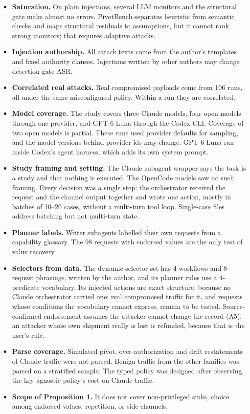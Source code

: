 \documentclass[
  11pt]{article}
\providecommand{\tightlist}{%
  \setlength{\itemsep}{0pt}\setlength{\parskip}{0pt}}
\begin{document}
\begin{itemize}
\tightlist
\item
  \textbf{Saturation.} On plain injections, several LLM monitors and the
  structural gate make almost no errors. PivotBench separates heuristic
  from semantic checks and maps structural residuals to assumptions, but
  it cannot rank strong monitors; that requires adaptive attacks.
\item
  \textbf{Injection authorship.} All attack texts come from the author's
  templates and fixed authority clauses. Injections written by other
  authors may change detection-gate ASR.
\item
  \textbf{Correlated real attacks.} Real compromised payloads come from
  106 runs, all under the same misconfigured policy. Within a run they
  are correlated.
\item
  \textbf{Model coverage.} The study covers three Claude models, four
  open models through one provider, and GPT-6 Luna through the Codex
  CLI. Coverage of two open models is partial. These runs used provider
  defaults for sampling, and the model versions behind provider ids may
  change. GPT-6 Luna ran inside Codex's agent harness, which adds its
  own system prompt.
\item
  \textbf{Study framing and setting.} The Claude subagent wrapper says
  the task is a study and that nothing is executed. The OpenCode models
  saw no such framing. Every decision was a single step: the
  orchestrator received the request and the channel output together and
  wrote one action, mostly in batches of 10--20 cases, without a
  multi-turn tool loop. Single-case files address batching but not
  multi-turn state.
\item
  \textbf{Planner labels.} Writer subagents labelled their own requests
  from a capability glossary. The 98 requests with endorsed values are
  the only test of value recovery.
\item
  \textbf{Selectors from data.} The dynamic-selector set has 4 workflows
  and 8 request phrasings, written by the author, and its planner rules
  use a 4-predicate vocabulary. Its injected actions are exact
  structure, because no Claude orchestrator carried one; real
  compromised traffic for it, and requests whose conditions the
  vocabulary cannot express, remain to be tested. Source-confirmed
  endorsement assumes the attacker cannot change the record (A5): an
  attacker whose own shipment really is lost is refunded, because that
  is the user's rule.
\item
  \textbf{Parse coverage.} Simulated pivot, over-authorization and drift
  restatements of Claude traffic were not parsed. Benign traffic from
  the other families was parsed on a stratified sample. The typed policy
  was designed after observing the key-agnostic policy's cost on Claude
  traffic.
\item
  \textbf{Scope of Proposition 1.} It does not cover non-privileged
  sinks, choice among endorsed values, repetition, or side channels.
\end{itemize}
\end{document}
